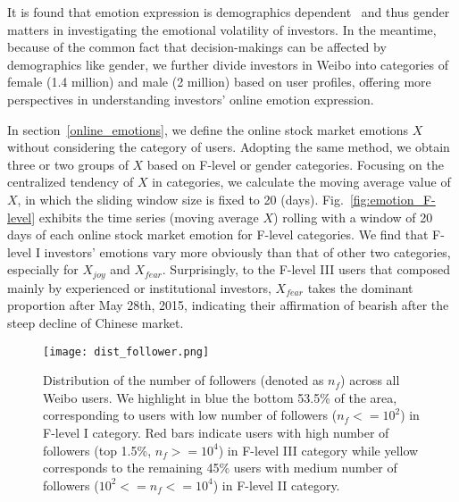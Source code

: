 \documentclass[aps,preprint,groupedaddress]{revtex4-1}
\begin{document}
It is found that emotion expression is demographics dependent~\cite{association_theory,hu2016ambivalence} and thus gender matters in investigating the emotional volatility of investors. In the meantime, because of the common fact that decision-makings can be affected by demographics like gender, we further divide investors in Weibo into categories of female (1.4 million) and male (2 million) based on user profiles, offering more perspectives in understanding investors' online emotion expression.

In section~\ref{online_emotions}, we define the online stock market emotions $X$ without considering the category of users. Adopting the same method, we obtain three or two groups of $X$ based on F-level or gender categories. Focusing on the centralized tendency of $X$ in categories, we calculate the moving average value of $X$, in which the sliding window size is fixed to 20 (days). Fig.~\ref{fig:emotion_F-level} exhibits the time series (moving average $X$) rolling with a window of 20 days of each online stock market emotion for F-level categories. We find that F-level I investors' emotions vary more obviously than that of other two categories, especially for $X_{joy}$ and $X_{fear}$. Surprisingly, to the F-level III users that composed mainly by experienced or institutional investors, $X_{fear}$ takes the dominant proportion after May 28th, 2015, indicating their affirmation of bearish after the steep decline of Chinese market.

\begin{figure}
\centering
\texttt{[image: dist\_follower.png]}
\caption{Distribution of the number of followers (denoted as $n_f$) across all Weibo users. We highlight in blue the bottom 53.5\% of the area, corresponding to users with low number of followers ($n_f<=10^2$) in F-level I category. Red bars indicate users with high number of followers (top 1.5\%, $n_f>=10^4$) in F-level III category while yellow corresponds to the remaining 45\% users with medium number of followers ($10^2<=n_f<=10^4$) in F-level II category.}
\label{fig:dist_follower}
\end{figure}
\end{document}
